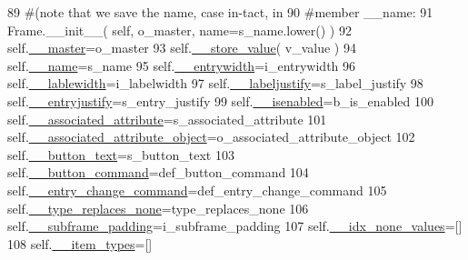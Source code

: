 \begin{DoxyCode}
89         \textcolor{comment}{#(note that we save the name, case in-tact, in}
90         \textcolor{comment}{#member \_\_name:}
91         Frame.\_\_init\_\_( self, o\_master, name=s\_name.lower() )
92         self.\hyperlink{classnegui_1_1pgguiutilities_1_1KeyValFrame_a59eae02effdbbbb9e3cf3e523639e8a8}{\_\_master}=o\_master
93         self.\hyperlink{classnegui_1_1pgguiutilities_1_1KeyValFrame_abb469e367148bbf7c3fb27a523360016}{\_\_store\_value}( v\_value )
94         self.\hyperlink{classnegui_1_1pgguiutilities_1_1KeyValFrame_a08a3969c0310f969954e2b7fdd57a440}{\_\_name}=s\_name
95         self.\hyperlink{classnegui_1_1pgguiutilities_1_1KeyValFrame_a3b64ca90cda3d4031e6a637a51c5124e}{\_\_entrywidth}=i\_entrywidth
96         self.\hyperlink{classnegui_1_1pgguiutilities_1_1KeyValFrame_a3d346c456ee536a5404a2a9f94a7a341}{\_\_lablewidth}=i\_labelwidth
97         self.\hyperlink{classnegui_1_1pgguiutilities_1_1KeyValFrame_a0b4d970d0edce0eb0a7d5fd20c7da5b8}{\_\_labeljustify}=s\_label\_justify
98         self.\hyperlink{classnegui_1_1pgguiutilities_1_1KeyValFrame_a4d0dae8b1d43e1804727b3dfe1ba3383}{\_\_entryjustify}=s\_entry\_justify
99         self.\hyperlink{classnegui_1_1pgguiutilities_1_1KeyValFrame_a02d9e7225b8a2fb0eda398e68991e0e8}{\_\_isenabled}=b\_is\_enabled
100         self.\hyperlink{classnegui_1_1pgguiutilities_1_1KeyValFrame_a27b2ed9e7eeccc56397136ba42ccdaeb}{\_\_associated\_attribute}=s\_associated\_attribute
101         self.\hyperlink{classnegui_1_1pgguiutilities_1_1KeyValFrame_a73863067b82206c4f7d307be73ae5cd7}{\_\_associated\_attribute\_object}=o\_associated\_attribute\_object
102         self.\hyperlink{classnegui_1_1pgguiutilities_1_1KeyValFrame_abcbe36760268b6a6f2436527e3b45a77}{\_\_button\_text}=s\_button\_text
103         self.\hyperlink{classnegui_1_1pgguiutilities_1_1KeyValFrame_a0a4e9593fba1c3c0defc524ada661261}{\_\_button\_command}=def\_button\_command
104         self.\hyperlink{classnegui_1_1pgguiutilities_1_1KeyValFrame_ab739e0f7c56624637e862d2c1fcf1d7c}{\_\_entry\_change\_command}=def\_entry\_change\_command
105         self.\hyperlink{classnegui_1_1pgguiutilities_1_1KeyValFrame_ad522d9fdeb611fb4854199a952a782d9}{\_\_type\_replaces\_none}=type\_replaces\_none
106         self.\hyperlink{classnegui_1_1pgguiutilities_1_1KeyValFrame_a7509de20f07f2afdc2bc5fda8bec6c61}{\_\_subframe\_padding}=i\_subframe\_padding
107         self.\hyperlink{classnegui_1_1pgguiutilities_1_1KeyValFrame_afbe0c687ff602e5d8e9eff5a410e98b4}{\_\_idx\_none\_values}=[]
108         self.\hyperlink{classnegui_1_1pgguiutilities_1_1KeyValFrame_a7984dc88ccd5c98089c6b9e13d750f31}{\_\_item\_types}=[]

\end{DoxyCode}
